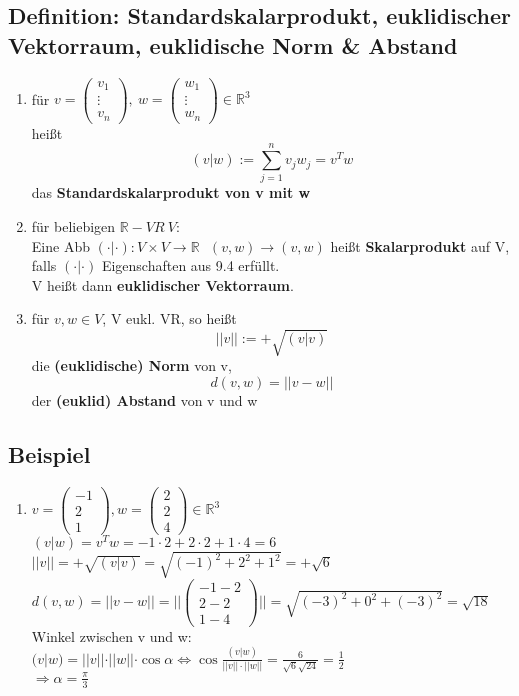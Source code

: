 \subsection{Definition: Standardskalarprodukt, euklidischer Vektorraum, euklidische Norm \& Abstand}
\begin{enumerate}
	\item
	für $v=\begin{pmatrix}v_1 \\ \vdots \\ v_n\end{pmatrix}, \ w=\begin{pmatrix}w_1 \\ \vdots \\ w_n\end{pmatrix}\in \mathbb{R}^3$\\
	heißt \[(v|w):=\sum_{j=1}^n v_jw_j = v^Tw\] das \textbf{Standardskalarprodukt von v mit w}
	
	\item
	für beliebigen $\mathbb{R}-VR \ V$:\\
	Eine Abb $(\cdot | \cdot ): V\times V\rightarrow\mathbb{R} \ \ \ (v,w)\rightarrow (v,w)$ heißt \textbf{Skalarprodukt} auf V, falls $(\cdot | \cdot )$ Eigenschaften aus 9.4 erfüllt.\\
	V heißt dann \textbf{euklidischer Vektorraum}.
	
	\item
	für $v,w\in V$, V eukl. VR, so heißt \[||v|| := +\sqrt{(v|v)}\] die \textbf{(euklidische) Norm} von v, \[d(v,w)=||v-w||\] der \textbf{(euklid) Abstand} von v und w
\end{enumerate}

\subsection{Beispiel}
\begin{enumerate}
	\item
	$v=\begin{pmatrix}-1 \\ 2 \\ 1\end{pmatrix}, w=\begin{pmatrix}2 \\ 2 \\ 4\end{pmatrix}\in\mathbb{R}^3$\\
	$(v|w)=v^Tw=-1\cdot 2+2\cdot 2+1\cdot 4=6$\\
	$||v||=+\sqrt{(v|v)}=\sqrt{(-1)^2+2^2+1^2}=+\sqrt{6}$\\
	$d(v,w)=||v-w||=||\begin{pmatrix}-1-2 \\ 2-2 \\ 1-4\end{pmatrix}||=\sqrt{(-3)^2+0^2+(-3)^2}=\sqrt{18}$\\
	Winkel zwischen v und w:\\
	$(v|w)=||v||\cdot ||w||\cdot \cos \alpha \Leftrightarrow \cos \frac{(v|w)}{||v||\cdot ||w||}=\frac{6}{\sqrt{6}\sqrt{24}}=\frac{1}{2}$\\
	$\Rightarrow \alpha=\frac{\pi}{3}$
\end{enumerate}
